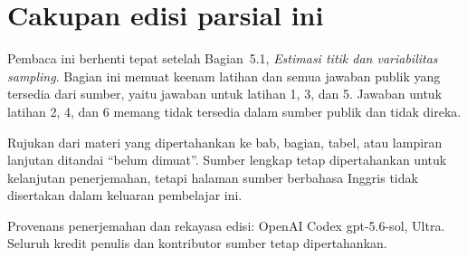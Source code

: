 \documentclass[10pt,openany]%
{book}
\date{}
\begin{document}
%
\renewcommand{\thepage}{}
\maketitle

\renewcommand{\thepage}{\arabic{page}}
\tableofcontents

\normalsize

\chapter*{Cakupan edisi parsial ini}
Pembaca ini berhenti tepat setelah Bagian~5.1,
\emph{Estimasi titik dan variabilitas sampling}. Bagian ini memuat keenam
latihan dan semua jawaban publik yang tersedia dari sumber, yaitu jawaban
untuk latihan 1, 3, dan 5. Jawaban untuk latihan 2, 4, dan 6 memang tidak
tersedia dalam sumber publik dan tidak direka.

Rujukan dari materi yang dipertahankan ke bab, bagian, tabel, atau lampiran
lanjutan ditandai ``belum dimuat''. Sumber lengkap tetap dipertahankan untuk
kelanjutan penerjemahan, tetapi halaman sumber berbahasa Inggris tidak
disertakan dalam keluaran pembelajar ini.

Provenans penerjemahan dan rekayasa edisi: OpenAI Codex gpt-5.6-sol, Ultra.
Seluruh kredit penulis dan kontributor sumber tetap dipertahankan.

\begingroup
\makeatletter
\def\@currentlabel{belum dimuat}
\label{ch_regr_mult_and_log}
\label{oneSampleMeansWithTDistribution}
\label{ch_regr_simple_linear}
\label{appendix_data}
\label{linRegrForTwoVar}
\label{normalProbabilityTable}
\label{multipleAndLogisticRegression}
\makeatother
\endgroup

\begingroup

%
\setcounter{chapter}{1}
\addtocounter{chapter}{-1}
\normalsize


\setcounter{chapter}{2}
\addtocounter{chapter}{-1}
\normalsize


\setcounter{chapter}{3}
\addtocounter{chapter}{-1}
\normalsize

\setcounter{chapter}{4}
\addtocounter{chapter}{-1}
\normalsize

\setcounter{chapter}{5}
\addtocounter{chapter}{-1}
\normalsize

\endgroup

\begingroup

\appendix{}
\endgroup
\end{document}
